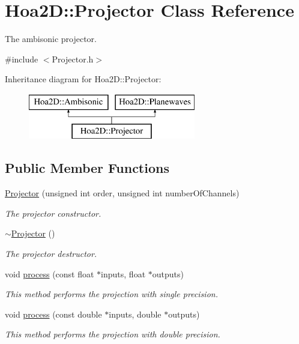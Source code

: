 \hypertarget{class_hoa2_d_1_1_projector}{\section{Hoa2\-D\-:\-:Projector Class Reference}
\label{class_hoa2_d_1_1_projector}
}


The ambisonic projector.  




{\ttfamily \#include $<$Projector.\-h$>$}

Inheritance diagram for Hoa2\-D\-:\-:Projector\-:\begin{figure}[H]
\begin{center}
\leavevmode
\includegraphics[height=2.000000cm]{class_hoa2_d_1_1_projector}
\end{center}
\end{figure}
\subsection*{Public Member Functions}
\begin{DoxyCompactItemize}
\item 
\hyperlink{class_hoa2_d_1_1_projector_a73b651a38b0680e6da45242073af54b7}{Projector} (unsigned int order, unsigned int number\-Of\-Channels)
\begin{DoxyCompactList}\small\item\em The projector constructor. \end{DoxyCompactList}\item 
\hyperlink{class_hoa2_d_1_1_projector_a7a93c4c33578b5f09636790a048c1351}{$\sim$\-Projector} ()
\begin{DoxyCompactList}\small\item\em The projector destructor. \end{DoxyCompactList}\item 
void \hyperlink{class_hoa2_d_1_1_projector_a3c4e52a53212701d92d5d5bff7af225b}{process} (const float $\ast$inputs, float $\ast$outputs)
\begin{DoxyCompactList}\small\item\em This method performs the projection with single precision. \end{DoxyCompactList}\item 
void \hyperlink{class_hoa2_d_1_1_projector_a60fe345d15f928b55a3755edb6f5026c}{process} (const double $\ast$inputs, double $\ast$outputs)
\begin{DoxyCompactList}\small\item\em This method performs the projection with double precision. \end{DoxyCompactList}\end{DoxyCompactItemize}
